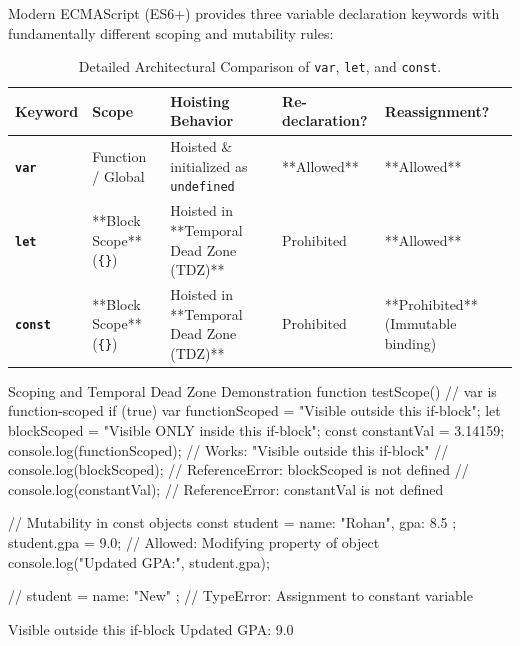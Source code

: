 Modern ECMAScript (ES6+) provides three variable declaration keywords with fundamentally different scoping and mutability rules:

\begin{table}[htbp]
\centering
\small
\renewcommand{\arraystretch}{1.3}
\begin{tabularx}{\linewidth}{llllX}
\toprule
\textbf{Keyword} & \textbf{Scope} & \textbf{Hoisting Behavior} & \textbf{Re-declaration?} & \textbf{Reassignment?} \\
\midrule
\textbf{\texttt{var}} & Function / Global & Hoisted \& initialized as \texttt{undefined} & **Allowed** & **Allowed** \\
\textbf{\texttt{let}} & **Block Scope** (\texttt{\{\}}) & Hoisted in **Temporal Dead Zone (TDZ)** & Prohibited & **Allowed** \\
\textbf{\texttt{const}} & **Block Scope** (\texttt{\{\}}) & Hoisted in **Temporal Dead Zone (TDZ)** & Prohibited & **Prohibited** (Immutable binding) \\
\bottomrule
\end{tabularx}
\caption{Detailed Architectural Comparison of \texttt{var}, \texttt{let}, and \texttt{const}.}
\label{tab:var-let-const}
\end{table}

\begin{jscode}{Scoping and Temporal Dead Zone Demonstration}
function testScope() {
    // var is function-scoped
    if (true) {
        var functionScoped = "Visible outside this if-block";
        let blockScoped = "Visible ONLY inside this if-block";
        const constantVal = 3.14159;
    }
    console.log(functionScoped); // Works: "Visible outside this if-block"
    // console.log(blockScoped);  // ReferenceError: blockScoped is not defined
    // console.log(constantVal);  // ReferenceError: constantVal is not defined
}

// Mutability in const objects
const student = { name: "Rohan", gpa: 8.5 };
student.gpa = 9.0; // Allowed: Modifying property of object
console.log("Updated GPA:", student.gpa);

// student = { name: "New" }; // TypeError: Assignment to constant variable
\end{jscode}

\begin{outputbox}
Visible outside this if-block
Updated GPA: 9.0
\end{outputbox}

